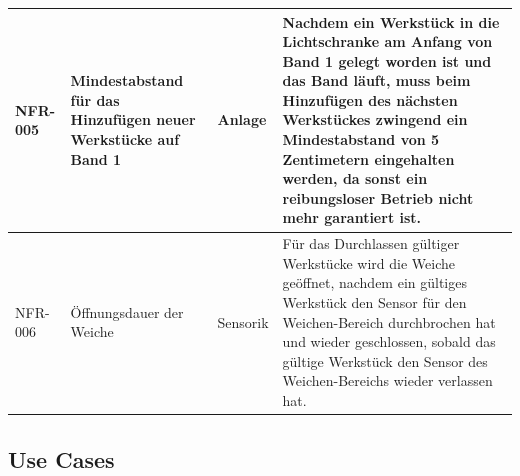 \documentclass[oneside,a4paper,titlepage]{scrartcl} %
\begin{document}
\begin{small}
\begin{longtable}{|p{2cm}|p{4cm}|p{1.5cm}|p{5.5cm}|}
  \hline
  NFR-005 & Mindestabstand für das Hinzufügen neuer Werkstücke auf Band 1 & Anlage & Nachdem ein Werkstück in die Lichtschranke am Anfang von Band 1 gelegt worden ist und das Band läuft, muss beim Hinzufügen des nächsten Werkstückes zwingend ein Mindestabstand von 5 Zentimetern eingehalten werden, da sonst ein reibungsloser Betrieb nicht mehr garantiert ist.\\
  \hline
  \rowcolor{lightgray} NFR-006 & Öffnungsdauer der Weiche & Sensorik & Für das Durchlassen gültiger Werkstücke wird die Weiche geöffnet, nachdem ein gültiges Werkstück den Sensor
  für den Weichen-Bereich durchbrochen hat und wieder geschlossen, sobald das
  gültige Werkstück den Sensor des Weichen-Bereichs wieder verlassen hat.\\
  \hline
 \end{longtable}
\end{small}

\newpage

\subsection{Use Cases}
\end{document}
